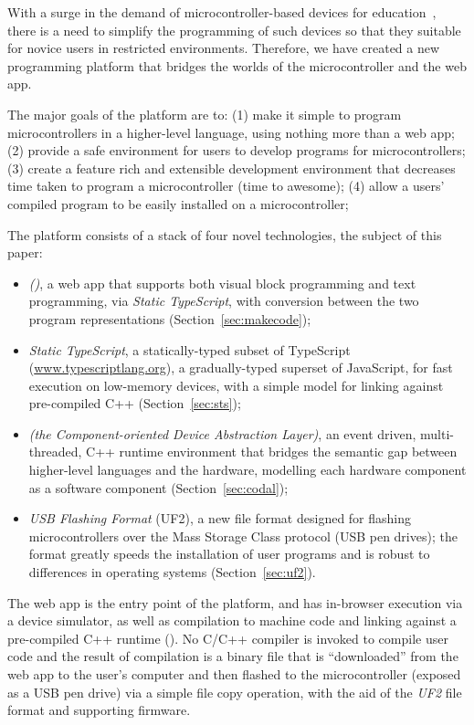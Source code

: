 With a surge in the demand of microcontroller-based devices for education~\cite{XYZ}, 
there is a need to simplify the programming of such devices so that they suitable 
for novice users in restricted environments.
Therefore, we have created a new programming platform that bridges the worlds of 
the microcontroller and the web app. 

The major goals of the platform are to:
(1) make it simple to program microcontrollers in a higher-level language,
using nothing more than a web app;
(2) provide a safe environment for users to develop programs for microcontrollers;
(3) create a feature rich and extensible development environment that decreases time taken to program a microcontroller (time to awesome);
(4) allow a users' compiled program to be easily installed on a microcontroller;


The platform consists of a stack of four novel technologies, the subject of
this paper:
\begin{itemize}
\item \emph{\MC ()}, a web app that supports both visual block programming and text programming,
via \emph{Static TypeScript}, with conversion between the two program representations (Section~\ref{sec:makecode});

\item \emph{Static TypeScript}, a statically-typed subset of TypeScript (\url{www.typescriptlang.org}),
a gradually-typed superset of JavaScript, for fast execution on low-memory devices, with
a simple model for linking against pre-compiled C++ (Section~\ref{sec:sts});

\item \emph{\CO (the Component-oriented Device Abstraction Layer)}, an event driven, multi-threaded, C++ runtime environment that bridges the semantic gap between higher-level languages and the hardware,
modelling each hardware component as a software component (Section~\ref{sec:codal});

\item \emph{USB Flashing Format} (UF2), a new file format designed for flashing microcontrollers 
over the Mass Storage Class protocol (USB pen drives); the format greatly speeds the installation of user
programs and is robust to differences in operating systems (Section~\ref{sec:uf2}).
\end{itemize}
The \MC web app is the entry point of the platform, and has in-browser execution via a device simulator, as well as compilation to machine code and linking against a
pre-compiled C++ runtime (\emph{\CON}). No C/C++ compiler is invoked to compile user code and the result of compilation is a binary file that is ``downloaded'' from the web app to the user's
computer and then flashed to the microcontroller (exposed as a USB pen drive) 
via a simple file copy operation,  with the aid of the \emph{UF2} file format and supporting firmware. 

